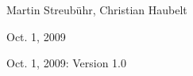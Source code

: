 \begin{frame}
\begin{description}[\breaklabel\setleftmargin{60pt}\setlabelstyle{\color{beamer@SystemCoDesigner@color}}]
\item[Authors:]
Martin Streubühr, Christian Haubelt
\item[Document Release:]
Oct. 1, 2009
\item[Version History:]
Oct. 1, 2009: Version 1.0
\end{description}
\end{frame}




\begin{frame}
{\footnotesize
\printindex
}
\end{frame}




